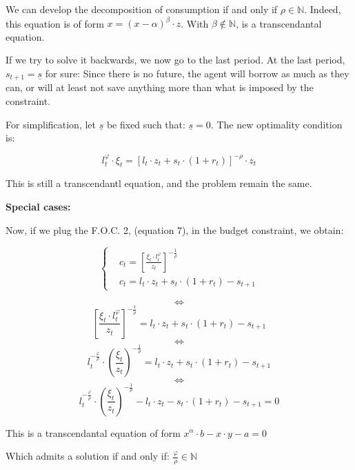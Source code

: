 \documentclass{article}
\begin{document}
We can develop the decomposition of consumption if and only if $\rho \in \mathbb{N}$.
Indeed, this equation is of form $x = (x-\alpha)^{\beta} \cdot z$.
With $\beta\notin \mathbb{N}$, is a transcendantal equation.


If we try to solve it backwards, we now go to the last period. 
At the last period, $s_{t+1} = \underline{s}$ for sure:
Since there is no future, 
the agent will borrow as much as they can,
or will at least not save anything more than what is imposed 
by the constraint. 

For simplification, let $\underline{s}$ be fixed such that: $\underline{s} = 0$.
The new optimality condition is: 

\begin{equation}
    l_{t}^{\varphi}\cdot \xi_{t} = \left[l_{t}\cdot z_{t} + s_{t}\cdot(1+r_{t})\right]^{-\rho}\cdot z_{t}
\end{equation}

This is still a transcendantl equation, and the problem remain the same.

\textbf{Special cases:}

Now, if we plug the F.O.C. 2, (equation 7), in the budget constraint, we obtain: 

$$
\begin{cases}
    & c_t = \left[\frac{\xi_{t}\cdot l_{t}^{\varphi}}{z_{t}}\right]^{-\frac{1}{\rho}} \\
    & c_{t} = l_{t}\cdot z_{t} + s_{t}\cdot(1+r_{t}) - s_{t+1} 
\end{cases}
$$

$$\iff$$
$$ \left[\frac{\xi_{t}\cdot l_{t}^{\varphi}}{z_{t}}\right]^{-\frac{1}{\rho}} = l_{t}\cdot z_{t} + s_{t}\cdot(1+r_{t}) - s_{t+1} $$
$$\iff$$
$$ l_{t}^{-\frac{\varphi}{\rho}} \cdot \left(\frac{\xi_{t}}{z_{t}}\right)^{-\frac{1}{\rho}} = l_{t}\cdot z_{t} + s_{t}\cdot(1+r_{t}) - s_{t+1} $$
$$\iff$$
$$ l_{t}^{-\frac{\varphi}{\rho}} \cdot \left(\frac{\xi_{t}}{z_{t}}\right)^{-\frac{1}{\rho}} - l_{t}\cdot z_{t} - s_{t}\cdot(1+r_{t}) - s_{t+1} = 0 $$

This is a transcendantal equation of form 
$x^{\alpha}\cdot b - x\cdot y - a = 0$

Which admits a solution if and only if: $\frac{\varphi}{\rho} \in \mathbb{N}$
\end{document}
